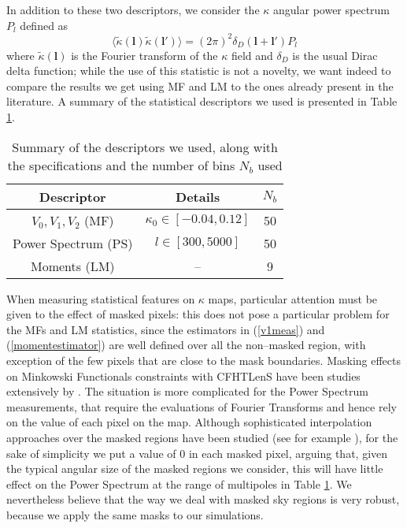 \documentclass[reprint,aps,prd,superscriptaddress,showkeys,showpacs]{revtex4-1}
\begin{document}
In addition to these two descriptors, we consider the $\kappa$ angular power spectrum $P_l$ defined as
\begin{equation}
\label{powerspectrum}
\langle\tilde{\kappa}(\mathbf{l})\tilde{\kappa}(\mathbf{l}')\rangle=(2\pi)^2\delta_D(\mathbf{l}+\mathbf{l}')P_l
\end{equation}  
%
%
where $\tilde{\kappa}(\mathbf{l})$ is the Fourier transform of the $\kappa$ field and $\delta_D$ is the usual Dirac delta function; while the use of this statistic is not a novelty, we want indeed to compare the results we get using MF and LM to the ones already present in the literature. A summary of the statistical descriptors we used is presented in Table \ref{desctable}. 
%
\begin{table}
\begin{tabular}{c|c|c} \hline
Descriptor & Details & $N_b$ \\ \hline
$V_0,V_1,V_2$ (MF) & $\kappa_0\in[-0.04,0.12]$ & 50 \\
Power Spectrum (PS) & $l \in [300,5000]$ & 50 \\
Moments (LM) & -- & 9 \\
\end{tabular}
\caption{Summary of the descriptors we used, along with the specifications and the number of bins $N_b$ used}
\label{desctable}
\end{table}
%
When measuring statistical features on $\kappa$ maps, particular attention must be given to the effect of masked pixels: this does not pose a particular problem for the MFs and LM statistics, since the estimators in (\ref{v1meas}) and (\ref{momentestimator}) are well defined over all the non--masked region, with exception of the few pixels that are close to the mask boundaries. Masking effects on Minkowski Functionals constraints with CFHTLenS have been studies extensively by \citep{CFHTMasato}. The situation is more complicated for the Power Spectrum measurements, that require the evaluations of Fourier Transforms and hence rely on the value of each pixel on the map. Although sophisticated interpolation approaches over the masked regions have been studied (see for example \citep{VplasInterpolation}), for the sake of simplicity we put a value of 0 in each masked pixel, arguing that, given the typical angular size of the masked regions we consider, this will have little effect on the Power Spectrum at the range of multipoles in Table \ref{desctable}. We nevertheless believe that the way we deal with masked sky regions is very robust, because we apply the same masks to our simulations. 
\end{document}

